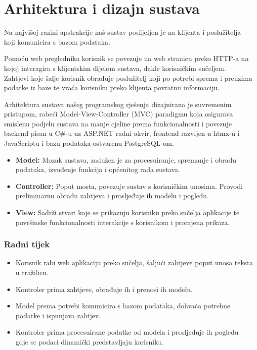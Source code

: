 \chapter{Arhitektura i dizajn sustava}

		Na najvišoj razini apstrakcije naš sustav podijeljen je na klijenta i poslužitelja koji komunicira s bazom podataka.
		
		Pomoću web preglednika korisnik se povezuje na web stranicu preko HTTP-a na kojoj interagira s klijentskim dijelom sustava, dakle korisničkim sučeljem. Zahtjevi koje šalje korisnik obrađuje poslužitelj koji po potrebi sprema i preuzima podatke iz baze te vraća korisniku preko klijenta povratnu informaciju.
	
		Arhitektura sustava našeg programskog rješenja dizajnirana je suvremenim pristupom, rabeći Model-View-Controller (MVC) paradigmu koja osigurava smislenu podjelu sustava na manje cjeline prema funkcionalnosti i povezuje backend pisan u C\#-u uz ASP.NET radni okvir, frontend razvijen u htmx-u i JavaScriptu i bazu podataka ostvarenu PostgreSQL-om.


		\begin{itemize}
			\item \textbf{Model:} Mozak sustava, zadužen je za procesuiranje, spremanje i obradu podataka, izvođenje funkcija i općenitog rada sustava. 
			\item \textbf{Controller:} Poput mosta, povezuje sustav s korisničkim unosima. Provodi preliminarnu obradu zahtjeva i prosljeđuje ih modelu i pogledu.
			\item \textbf{View:} Sadrži stvari koje se prikazuju korisniku preko sučelja aplikacije te površinske funkcionalnosti interakcije s korisnikom i promjena prikaza.
		\end{itemize}
		
		\subsection*{Radni tijek}
		
		\begin{itemize}
			\item Korisnik rabi web aplikaciju preko sučelja, šaljući zahtjeve poput unosa teksta u tražilicu.
			\item Kontroler prima zahtjeve, obrađuje ih i prenosi ih modelu.
			\item Model prema potrebi komunicira s bazom podataka, dohvaća potrebne podatke i ispunjava zahtjev.
			\item Kontroler prima procesuirane podatke od modela i prosljeđuje ih pogledu gdje se podaci dinamički predstavljaju korisniku.
		\end{itemize}
				
